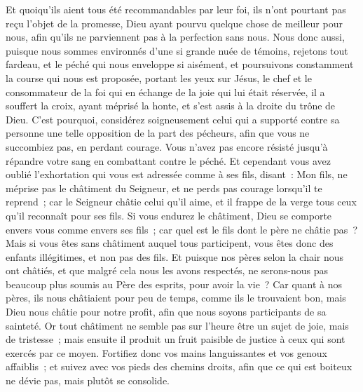 \begin{multicols}{2}
 Et quoiqu'ils aient tous été recommandables par leur foi, ils n'ont pourtant pas reçu l'objet de la promesse,
Dieu ayant pourvu quelque chose de meilleur pour nous, afin qu'ils ne parviennent pas à la perfection sans nous.
\VerseOne{}Nous donc aussi, puisque nous sommes environnés d'une si grande nuée de témoins, rejetons tout fardeau, et le péché qui nous enveloppe si aisément, et poursuivons constamment la course qui nous est proposée,
portant les yeux sur Jésus, le chef et le consommateur de la foi qui en échange de la joie qui lui était réservée, il a souffert la croix, ayant méprisé la honte, et s'est assis à la droite du trône de Dieu.
C'est pourquoi, considérez soigneusement celui qui a supporté contre sa personne une telle opposition de la part des pécheurs, afin que vous ne succombiez pas, en perdant courage.
Vous n'avez pas encore résisté jusqu'à répandre votre sang en combattant contre le péché.
Et cependant vous avez oublié l'exhortation qui vous est adressée comme à ses fils, disant~: Mon fils, ne méprise pas le châtiment du Seigneur, et ne perds pas courage lorsqu'il te reprend~;
car le Seigneur châtie celui qu'il aime, et il frappe de la verge tous ceux qu'il reconnaît pour ses fils.
Si vous endurez le châtiment, Dieu se comporte envers vous comme envers ses fils~; car quel est le fils dont le père ne châtie pas~?
Mais si vous êtes sans châtiment auquel tous participent, vous êtes donc des enfants illégitimes, et non pas des fils.
Et puisque nos pères selon la chair nous ont châtiés, et que malgré cela nous les avons respectés, ne serons-nous pas beaucoup plus soumis au Père des esprits, pour avoir la vie~?
Car quant à nos pères, ils nous châtiaient pour peu de temps, comme ils le trouvaient bon, mais Dieu nous châtie pour notre profit, afin que nous soyons participants de sa sainteté.
Or tout châtiment ne semble pas sur l'heure être un sujet de joie, mais de tristesse~; mais ensuite il produit un fruit paisible de justice à ceux qui sont exercés par ce moyen.
Fortifiez donc vos mains languissantes et vos genoux affaiblis~;
et suivez avec vos pieds des chemins droits, afin que ce qui est boiteux ne dévie pas, mais plutôt se consolide.

\end{multicols}
